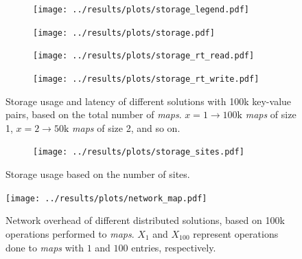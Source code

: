 \documentclass[border=2cm]{standalone}
\begin{document}
\begin{minipage}{17cm}
  \medskip

  \begin{figure}[t]
    \centering
    \begin{subfigure}{\linewidth}
      \centering
      \hspace*{0.8cm}
      \texttt{[image: ../results/plots/storage\_legend.pdf]}
    \end{subfigure}

    \medskip

    \begin{subfigure}{.22\linewidth}
      \centering
      \texttt{[image: ../results/plots/storage.pdf]}
      \label{fig:storage_mb}
    \end{subfigure}
    \hspace*{0.5cm}
    \begin{subfigure}{.173\linewidth}
      \centering
      \texttt{[image: ../results/plots/storage\_rt\_read.pdf]}
      \label{fig:storage_read}
    \end{subfigure}
    \begin{subfigure}{.1315\linewidth}
      \centering
      \texttt{[image: ../results/plots/storage\_rt\_write.pdf]}
      \label{fig:storage_write}
    \end{subfigure}
    \caption{Storage usage and latency of different solutions with 100k key-value pairs, based on the total number of \textit{maps}.
      \normalfont \small $x \! = \! 1 \rightarrow 100\mbox{k}$ \textit{maps} of size 1, $x \! = \! 2 \rightarrow 50\mbox{k}$ \textit{maps} of size 2, and so on.}
    \label{fig:storage}
  \end{figure}

  \medskip

  \begin{figure}[t]
    \centering
    \begin{subfigure}{.26\linewidth}
      \centering
      \texttt{[image: ../results/plots/storage\_sites.pdf]}
      \label{fig:storage_sites_mb}
    \end{subfigure}
    \caption{Storage usage based on the number of sites.}
    \label{fig:storage_sites}
  \end{figure}

  \medskip

  \begin{figure}[t]
    \centering
    \texttt{[image: ../results/plots/network\_map.pdf]}
    \caption{Network overhead of different distributed solutions, based on 100k operations performed to \textit{maps}.
      \normalfont \small $X_1$ and $X_{100}$ represent operations done to \textit{maps} with $1$ and $100$ entries, respectively.}
    \label{fig:network}
  \end{figure}


\end{minipage}
\end{document}
